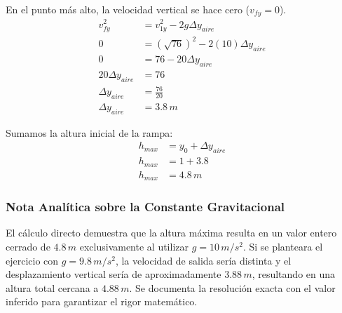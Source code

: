 \documentclass[12pt, a4paper]{article}
\begin{document}
En el punto más alto, la velocidad vertical se hace cero ($v_{fy} = 0$).
\begin{align*}
v_{fy}^2 &= v_{1y}^2 - 2g \Delta y_{aire} \\
0 &= (\sqrt{76})^2 - 2(10) \Delta y_{aire} \\
0 &= 76 - 20 \Delta y_{aire} \\
20 \Delta y_{aire} &= 76 \\
\Delta y_{aire} &= \frac{76}{20} \\
\Delta y_{aire} &= 3.8 \, \si{m}
\end{align*}

Sumamos la altura inicial de la rampa:
\begin{align*}
h_{max} &= y_0 + \Delta y_{aire} \\
h_{max} &= 1 + 3.8 \\
h_{max} &= 4.8 \, \si{m}
\end{align*}

\subsubsection*{Nota Analítica sobre la Constante Gravitacional}
El cálculo directo demuestra que la altura máxima resulta en un valor entero cerrado de $4.8 \, \si{m}$ exclusivamente al utilizar $g = 10 \, \si{m/s^2}$. Si se planteara el ejercicio con $g = 9.8 \, \si{m/s^2}$, la velocidad de salida sería distinta y el desplazamiento vertical sería de aproximadamente $3.88 \, \si{m}$, resultando en una altura total cercana a $4.88 \, \si{m}$. Se documenta la resolución exacta con el valor inferido para garantizar el rigor matemático.
\end{document}
